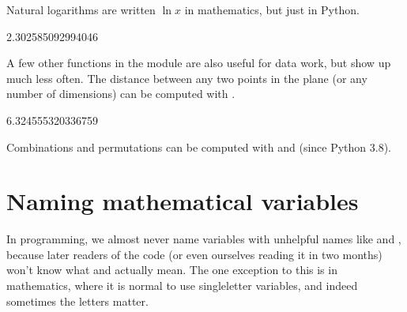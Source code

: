 \documentclass[letterpaper,10pt,english]{jupyterBook}
\begin{document}
\sphinxAtStartPar
Natural logarithms are written \(\ln x\) in mathematics, but just  in Python.

\begin{sphinxVerbatim}[commandchars=\\\{\}]
    
\end{sphinxVerbatim}

\begin{sphinxVerbatim}[commandchars=\\\{\}]
2.302585092994046
\end{sphinxVerbatim}

\sphinxAtStartPar
A few other functions in the  module are also useful for data work, but show up much less often.  The distance between any two points in the plane (or any number of dimensions) can be computed with .

\begin{sphinxVerbatim}[commandchars=\\\{\}]
   
\end{sphinxVerbatim}

\begin{sphinxVerbatim}[commandchars=\\\{\}]
6.324555320336759
\end{sphinxVerbatim}

\sphinxAtStartPar
Combinations and permutations can be computed with  and  (since Python 3.8).


\section{Naming mathematical variables}
\label{\detokenize{chapter-9-math-and-stats:naming-mathematical-variables}}
\sphinxAtStartPar
In programming, we almost never name variables with unhelpful names like  and , because later readers of the code (or even ourselves reading it in two months) won’t know what  and  actually mean.  The one exception to this is in mathematics, where it is normal to use single\sphinxhyphen{}letter variables, and indeed sometimes the letters matter.
\end{document}
